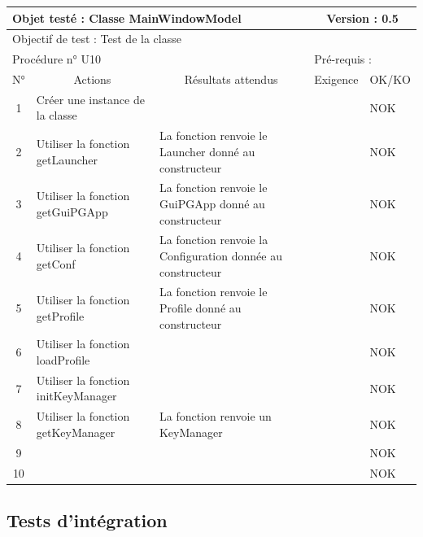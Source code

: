 \documentclass{../res/univ-projet}
\begin{document}
\begin{center}
    \begin{tabular}{|c|p{5cm}|p{5cm}|p{1.5cm}|p{1.5cm}|}
      \hline
      \multicolumn{3}{|l|}{Objet testé : Classe MainWindowModel} & \multicolumn{2}{c|}{Version : 0.5}\\ \hline
      \multicolumn{5}{|l|}{Objectif de test : Test de la classe}\\ \hline
      \multicolumn{3}{|l|}{Procédure n° U10} & \multicolumn{2}{p{3cm}|}{Pré-requis : }\\ \hline
      \multicolumn{1}{|c|}{N°} & \multicolumn{1}{c|}{Actions} & \multicolumn{1}{c|}{Résultats attendus} & 
      \multicolumn{1}{c|}{Exigence} & \multicolumn{1}{c|}{OK/KO}\\ \hline
      1 & Créer une instance de la classe &  &  & NOK \\
      2 & Utiliser la fonction getLauncher & La fonction renvoie le Launcher donné au constructeur &  & NOK \\
      3 & Utiliser la fonction getGuiPGApp & La fonction renvoie le GuiPGApp donné au constructeur &  & NOK \\
      4 & Utiliser la fonction getConf & La fonction renvoie la Configuration donnée au constructeur &  & NOK \\
      5 & Utiliser la fonction getProfile & La fonction renvoie le Profile donné au constructeur &  & NOK \\
      6 & Utiliser la fonction loadProfile &  &  & NOK \\
      7 & Utiliser la fonction initKeyManager &  &  & NOK \\
      8 & Utiliser la fonction getKeyManager & La fonction renvoie un KeyManager &  & NOK \\
      9 &  &  &  & NOK \\
      10 &  &  &  & NOK \\ 
  \hline
    \end{tabular}
    \vskip 2.2cm



\subsection{Tests d'intégration}



\end{center}
\end{document}
